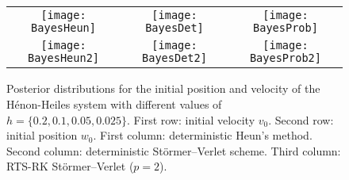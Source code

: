 \documentclass[10pt]{article}
\begin{document}
\subsection{}\label{sec:BayesianInferenceEx}
\begin{figure}	
	\begin{center}
		
		\vspace{0.1cm}
		\begin{tabular}{ccc}
			\hspace{-0.32cm}\texttt{[image: BayesHeun]}  & \hspace{-0.32cm}\texttt{[image: BayesDet]}  & \hspace{-0.32cm}\texttt{[image: BayesProb]} \\ 
			\texttt{[image: BayesHeun2]} & \texttt{[image: BayesDet2]} & \texttt{[image: BayesProb2]} \\
		\end{tabular}
	\end{center}
	\caption{Posterior distributions for the initial position and velocity of the Hénon-Heiles system with different values of $h = \{0.2, 0.1, 0.05, 0.025\}$. First row: initial velocity $v_0$. Second row: initial position $w_0$. First column: deterministic Heun's method. Second column: deterministic Störmer--Verlet scheme. Third column: RTS-RK Störmer--Verlet ($p=2$).}
	\label{fig:Bayes}
\end{figure}
\end{document}
